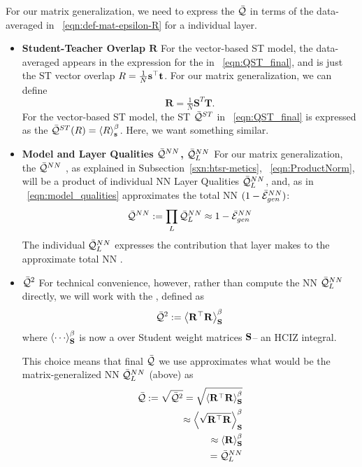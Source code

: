 For our matrix generalization, we need to express the \LayerQuality $\bar{\mathcal{Q}}$ in terms of the data-averaged
\SelfOverlap in \EQN~\ref{eqn:def-mat-epsilon-R} for a individual layer.
\begin{itemize}
\item
\textbf{Student-Teacher Overlap  $\mathbf{R}$}
For the vector-based \Perceptron ST model, the data-averaged \SelfOverlap appears in the expression for the
\LayerQuality  in \EQN~\ref{eqn:QST_final}, and is just the ST vector overlap  $R=\frac{1}{N}{\mathbf{s}}^{\top}{\mathbf{t}}$. 
For our matrix generalization, we can define
\begin{equation}
\mathbf{R} = \tfrac{1}{N} \mathbf{S}^{T} \mathbf{T}  .
\end{equation}
For the vector-based ST model, the ST \Quality $\bar{\mathcal{Q}}^{ST}$ in \EQN~\ref{eqn:QST_final} is expressed as
the \ThermalAverage $\bar{\mathcal{Q}}^{ST}(R)=\left\langle R \right\rangle_{\mathbf s}^{\beta}$. Here, we want something similar.
\item
\textbf{Model and Layer Qualities $\bar{\mathcal{Q}}^{NN}$, $\bar{\mathcal{Q}}^{NN}_{L}$}
For our matrix generalization, the \ModelQuality $\bar{\mathcal{Q}}^{NN}$ ,
as explained in Subsection~\ref{sxn:htsr-metics}, \EQN~\ref{eqn:ProductNorm},
will be a product of individual NN Layer Qualities $\bar{\mathcal{Q}}^{NN}_{L}$,
and, as in \EQN~\ref{eqn:model_qualities}
approximates the total NN \AverageGeneralizationAccuracy $(1-\bar{\mathcal{E}}_{gen}^{NN})$:
\begin{equation}
 \bar{\mathcal{Q}}^{NN}:=\prod_{L}\bar{\mathcal{Q}}^{NN}_{L}\approx 1-\bar{\mathcal{E}}_{gen}^{NN} 
\end{equation}
The individual $\bar{\mathcal{Q}}^{NN}_{L}$ expresses the contribution that layer makes
to the approximate total NN \AverageGeneralizationAccuracy.
\item
 \textbf{\LayerQualitySquared $\bar{\mathcal{Q}}^{2}$}
For  technical convenience, however, rather than compute
the NN \LayerQuality $\bar{\mathcal{Q}}^{NN}_{L}$ directly, we will work with the \emph{\AverageLayerQualitySquared}, 
defined as
\begin{align}
  \label{eqn:QT_1}
  \bar{\mathcal{Q}}^{2}:=\left\langle {\mathbf{R}}^{\top}\mathbf{R} \right\rangle_{\mathbf S}^{\beta}
\end{align}
where  $\THRMAVGIZ{\cdots}$ is now a \ThermalAverage over Student weight matrices ${\mathbf{S}}$--
an HCIZ integral.

This choice means that final \LayerQuality $\bar{\mathcal{Q}}$ we use approximates what would be the
matrix-generalized NN \LayerQuality $\bar{\mathcal{Q}}^{NN}_{L}$ (above) as
\begin{align}
  \label{eqn:QT_2}
  \bar{\mathcal{Q}}:=\sqrt{\bar{\mathcal{Q}}^{2}}
  =\sqrt{\left\langle {\mathbf{R}}^{\top}\mathbf{R} \right\rangle_{\mathbf S}^{\beta}} \\ \nonumber
  \approx\left\langle \sqrt{{\mathbf{R}}^{\top}\mathbf{R}} \right\rangle_{\mathbf S}^{\beta} \\ \nonumber
  \approx\left\langle \mathbf{R} \right\rangle_{\mathbf S}^{\beta} \\ \nonumber
  = \bar{\mathcal{Q}}^{NN}_{L}
\end{align}


\end{itemize}
